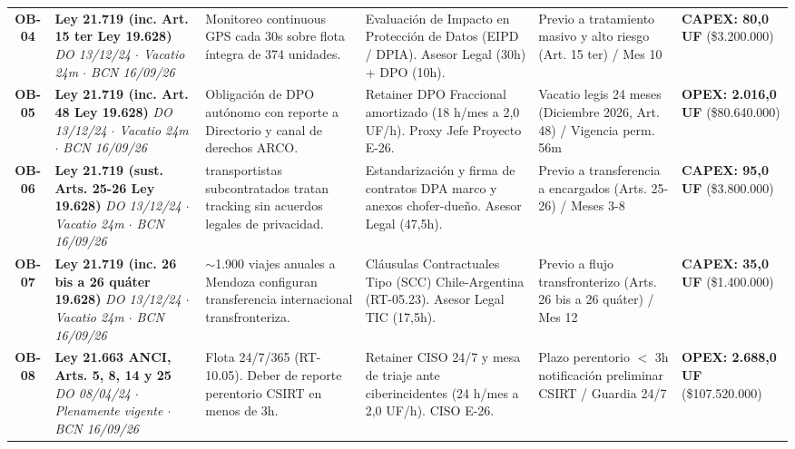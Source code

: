 \documentclass[7.5pt,letterpaper]{article}
\begin{document}
\begin{tabularx}{\textwidth}{@{} c >{\raggedright\arraybackslash}p{2.5cm} >{\raggedright\arraybackslash}p{3.2cm} >{\raggedright\arraybackslash}p{3.5cm} >{\raggedright\arraybackslash}X >{\raggedleft\arraybackslash}p{1.9cm} @{}}
\rowcolor{RowAltBg}
\textbf{OB-04} & \textbf{Ley 21.719 (inc. Art. 15 ter Ley 19.628)} \newline \textit{DO 13/12/24 $\cdot$ Vacatio 24m $\cdot$ BCN 16/09/26} & Monitoreo continuous GPS cada 30s sobre flota íntegra de 374 unidades. & Evaluación de Impacto en Protección de Datos (EIPD / DPIA). Asesor Legal (30h) + DPO (10h). & Previo a tratamiento masivo y alto riesgo (Art. 15 ter) / Mes 10 & \textbf{CAPEX: 80,0 UF} \newline (\$3.200.000) \\
\textbf{OB-05} & \textbf{Ley 21.719 (inc. Art. 48 Ley 19.628)} \newline \textit{DO 13/12/24 $\cdot$ Vacatio 24m $\cdot$ BCN 16/09/26} & Obligación de DPO autónomo con reporte a Directorio y canal de derechos ARCO. & Retainer DPO Fraccional amortizado (18 h/mes a 2,0 UF/h). Proxy Jefe Proyecto E-26. & Vacatio legis 24 meses (Diciembre 2026, Art. 48) / Vigencia perm. 56m & \textbf{OPEX: 2.016,0 UF} \newline (\$80.640.000) \\
\rowcolor{RowAltBg}
\textbf{OB-06} & \textbf{Ley 21.719 (sust. Arts. 25-26 Ley 19.628)} \newline \textit{DO 13/12/24 $\cdot$ Vacatio 24m $\cdot$ BCN 16/09/26} & 148 transportistas subcontratados tratan tracking sin acuerdos legales de privacidad. & Estandarización y firma de contratos DPA marco y anexos chofer-dueño. Asesor Legal (47,5h). & Previo a transferencia a encargados (Arts. 25-26) / Meses 3-8 & \textbf{CAPEX: 95,0 UF} \newline (\$3.800.000) \\
\textbf{OB-07} & \textbf{Ley 21.719 (inc. 26 bis a 26 quáter 19.628)} \newline \textit{DO 13/12/24 $\cdot$ Vacatio 24m $\cdot$ BCN 16/09/26} & $\sim$1.900 viajes anuales a Mendoza configuran transferencia internacional transfronteriza. & Cláusulas Contractuales Tipo (SCC) Chile-Argentina (RT-05.23). Asesor Legal TIC (17,5h). & Previo a flujo transfronterizo (Arts. 26 bis a 26 quáter) / Mes 12 & \textbf{CAPEX: 35,0 UF} \newline (\$1.400.000) \\
\rowcolor{RowAltBg}
\textbf{OB-08} & \textbf{Ley 21.663 ANCI, Arts. 5, 8, 14 y 25} \newline \textit{DO 08/04/24 $\cdot$ Plenamente vigente $\cdot$ BCN 16/09/26} & Flota 24/7/365 (RT-10.05). Deber de reporte perentorio CSIRT en menos de 3h. & Retainer CISO 24/7 y mesa de triaje ante ciberincidentes (24 h/mes a 2,0 UF/h). CISO E-26. & Plazo perentorio $<$ 3h notificación preliminar CSIRT / Guardia 24/7 & \textbf{OPEX: 2.688,0 UF} \newline (\$107.520.000) \\

\end{tabularx}
\end{document}
